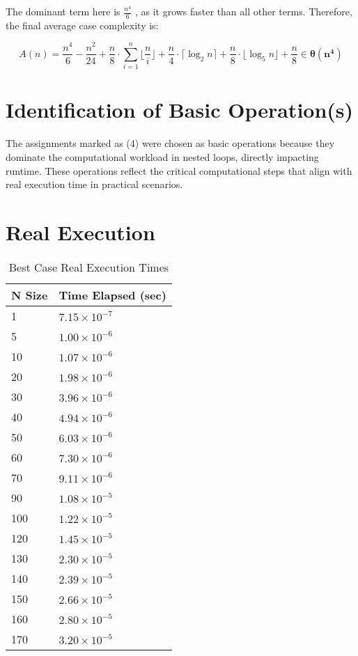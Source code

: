 \documentclass[11pt, oneside, a4paper]{article}
\begin{document}
The dominant term here is \( \frac{n^4}{6}\) , as it grows faster than all other terms. Therefore, the final average case complexity is:

\[
A(n) = \frac{n^4}{6} - \frac{n^2}{24} + \frac{n}{8} \cdot \sum_{i=1}^{n} \lfloor\frac{n}{i} \rfloor + \frac{n}{4} \cdot \lceil \log_2 n \rceil + \frac{n}{8} \cdot \lfloor \log_5 n \rfloor + \frac{n}{8} \in \boldsymbol{\theta(n^4)}
\]


	\section{Identification of Basic Operation(s)}
The assignments marked as (4) were chosen as basic operations because they dominate the computational workload in nested loops, directly impacting runtime. These operations reflect the critical computational steps that align with real execution time in practical scenarios.



	\section{Real Execution}

	\begin{table}[H]
		\centering
		\begin{tabular}{|l|l|} \hline
			\textbf{N Size} & \textbf{Time Elapsed (sec)} \\ \hline
			1 & \( 7.15 \times 10^{-7}\) \\ \hline
			5 & \( 1.00 \times 10^{-6}\) \\ \hline
			10 & \( 1.07 \times 10^{-6}\) \\ \hline
			20 & \( 1.98 \times 10^{-6}\) \\ \hline
			30 & \( 3.96 \times 10^{-6}\) \\ \hline
			40 & \( 4.94 \times 10^{-6}\) \\ \hline
			50 & \( 6.03 \times 10^{-6}\) \\ \hline
			60 & \( 7.30 \times 10^{-6}\) \\ \hline
			70 & \( 9.11 \times 10^{-6}\) \\ \hline
			90 & \( 1.08 \times 10^{-5}\) \\ \hline
			100 & \( 1.22 \times 10^{-5}\) \\ \hline
			120 & \( 1.45 \times 10^{-5}\) \\ \hline
			130 & \( 2.30 \times 10^{-5}\) \\ \hline
			140 & \( 2.39 \times 10^{-5}\) \\ \hline
			150 & \( 2.66 \times 10^{-5}\) \\ \hline
			160 & \( 2.80 \times 10^{-5}\) \\ \hline
			170 & \( 3.20 \times 10^{-5}\) \\ \hline
		\end{tabular}
		\caption{Best Case Real Execution Times}
		\label{tab:best-case}
	\end{table}
\end{document}
